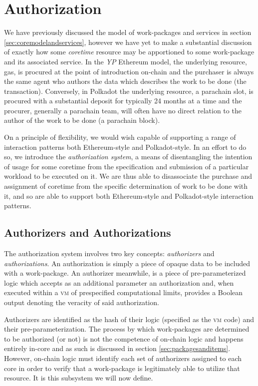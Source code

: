\section{Authorization}\label{sec:authorization}

We have previously discussed the model of work-packages and services in section \ref{sec:coremodelandservices}, however we have yet to make a substantial discussion of exactly how some \emph{coretime} resource may be apportioned to some work-package and its associated service. In the \emph{YP} Ethereum model, the underlying resource, gas, is procured at the point of introduction on-chain and the purchaser is always the same agent who authors the data which describes the work to be done (\ie the transaction). Conversely, in Polkadot the underlying resource, a parachain slot, is procured with a substantial deposit for typically 24 months at a time and the procurer, generally a parachain team, will often have no direct relation to the author of the work to be done (\ie a parachain block).

On a principle of flexibility, we would wish \Jam capable of supporting a range of interaction patterns both Ethereum-style and Polkadot-style. In an effort to do so, we introduce the \emph{authorization system}, a means of disentangling the intention of usage for some coretime from the specification and submission of a particular workload to be executed on it. We are thus able to disassociate the purchase and assignment of coretime from the specific determination of work to be done with it, and so are able to support both Ethereum-style and Polkadot-style interaction patterns.

\subsection{Authorizers and Authorizations}

The authorization system involves two key concepts: \emph{authorizers} and \emph{authorizations}. An authorization is simply a piece of opaque data to be included with a work-package. An authorizer meanwhile, is a piece of pre-parameterized logic which accepts as an additional parameter an authorization and, when executed within a \textsc{vm} of prespecified computational limits, provides a Boolean output denoting the veracity of said authorization.

Authorizers are identified as the hash of their logic (specified as the \textsc{vm} code) and their pre-parameterization. The process by which work-packages are determined to be authorized (or not) is not the competence of on-chain logic and happens entirely in-core and as such is discussed in section \ref{sec:packagesanditems}. However, on-chain logic must identify each set of authorizers assigned to each core in order to verify that a work-package is legitimately able to utilize that resource. It is this subsystem we will now define.

